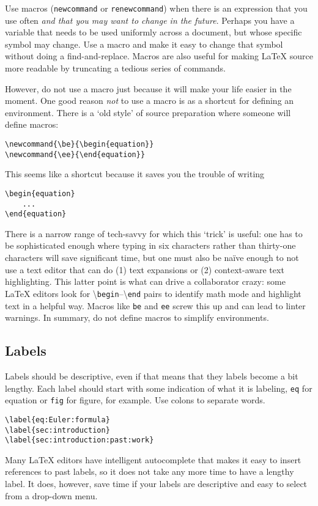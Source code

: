 Use macros (\texttt{newcommand} or \texttt{renewcommand}) when there is an expression that you use often \emph{and that you may want to change in the future}. Perhaps you have a variable that needs to be used uniformly across a document, but whose specific symbol may change. Use a macro and make it easy to change that symbol without doing a find-and-replace. Macros are also useful for making \LaTeX{} source more readable by truncating a tedious series of commands. 

However, do not use a macro just because it will make your life easier in the moment. One good reason \emph{not} to use a macro is as a shortcut for defining an environment. There is a `old style' of source preparation where someone will define macros:
% 
\begin{lstlisting}[style=latexstyle]
\newcommand{\be}{\begin{equation}}
\newcommand{\ee}{\end{equation}}
\end{lstlisting}
% 
This seems like a shortcut because it saves you the trouble of writing
% 
\begin{lstlisting}[style=latexstyle]
\begin{equation}
	...
\end{equation}
\end{lstlisting}
% 
There is a narrow range of tech-savvy for which this `trick' is useful: one has to be sophisticated enough where typing in six characters rather than thirty-one characters will save significant time, but one must also be na\"ive enough to not use a text editor that can do (1) text expansions or (2) context-aware text highlighting. 
% 
This latter point is what can drive a collaborator crazy: some \LaTeX{} editors look for \textbackslash\texttt{begin}--\textbackslash\texttt{end} pairs to identify math mode and highlight text in a helpful way. Macros like \texttt{be} and \texttt{ee} screw this up and can lead to linter warnings. In summary, do not define macros to simplify environments.


\subsection{Labels}

Labels should be descriptive, even if that means that they labels become a bit lengthy. Each label should start with some indication of what it is labeling, \texttt{eq} for equation or \texttt{fig} for figure, for example. Use colons to separate words.
% 
\begin{lstlisting}[style=latexstyle]
\label{eq:Euler:formula}
\label{sec:introduction}
\label{sec:introduction:past:work}
\end{lstlisting}
% 
Many \LaTeX{} editors have intelligent autocomplete that makes it easy to insert references to past labels, so it does not take any more time to have a lengthy label. It does, however, save time if your labels are descriptive and easy to select from a drop-down menu. 


